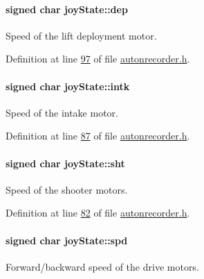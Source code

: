 \paragraph[{\texorpdfstring{dep}{dep}}]{\setlength{\rightskip}{0pt plus 5cm}signed char joy\+State\+::dep}\hypertarget{structjoy_state_a3ba5ee3c4eec0e2ee03338b397a17958}{}\label{structjoy_state_a3ba5ee3c4eec0e2ee03338b397a17958}
Speed of the lift deployment motor. 

Definition at line \hyperlink{autonrecorder_8h_source_l00097}{97} of file \hyperlink{autonrecorder_8h_source}{autonrecorder.\+h}.

\paragraph[{\texorpdfstring{intk}{intk}}]{\setlength{\rightskip}{0pt plus 5cm}signed char joy\+State\+::intk}\hypertarget{structjoy_state_a2314ed43be31ccc565381efd8398b921}{}\label{structjoy_state_a2314ed43be31ccc565381efd8398b921}
Speed of the intake motor. 

Definition at line \hyperlink{autonrecorder_8h_source_l00087}{87} of file \hyperlink{autonrecorder_8h_source}{autonrecorder.\+h}.

\paragraph[{\texorpdfstring{sht}{sht}}]{\setlength{\rightskip}{0pt plus 5cm}signed char joy\+State\+::sht}\hypertarget{structjoy_state_a751363be4e40b27bcbe558f41a15fe91}{}\label{structjoy_state_a751363be4e40b27bcbe558f41a15fe91}
Speed of the shooter motors. 

Definition at line \hyperlink{autonrecorder_8h_source_l00082}{82} of file \hyperlink{autonrecorder_8h_source}{autonrecorder.\+h}.

\paragraph[{\texorpdfstring{spd}{spd}}]{\setlength{\rightskip}{0pt plus 5cm}signed char joy\+State\+::spd}\hypertarget{structjoy_state_a7867156ddb5bc22d57010c5af00c98af}{}\label{structjoy_state_a7867156ddb5bc22d57010c5af00c98af}
Forward/backward speed of the drive motors. 


